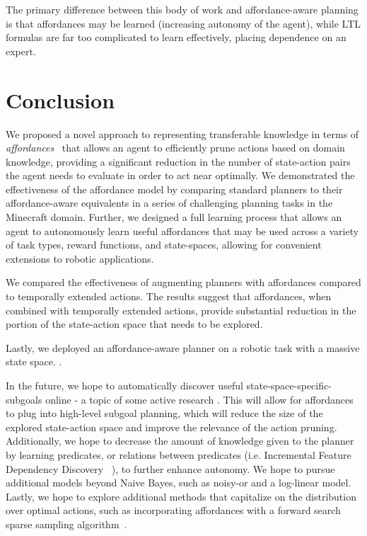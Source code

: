 \documentclass[conference]{IEEEtran}
\newcommand{\dnote}[1]{\textcolor{Green}{\textbf{}}}
\begin{document}
The primary difference between this body of work and affordance-aware planning is that affordances may be learned (increasing autonomy of the agent), while LTL formulas are far too complicated to learn effectively, placing dependence on an expert.

\section{Conclusion}
\label{sec:conclusion}
\dnote{Conclusion could use some work/rewriting}
We proposed a novel approach to representing transferable knowledge in terms of
{\em affordances}~\cite{gibson77} that allows an agent to efficiently prune actions 
based on domain knowledge, providing a significant reduction in the number of state-action
pairs the agent needs to evaluate in order to act near optimally. We demonstrated the 
effectiveness of the affordance model by comparing standard planners to their affordance-aware
equivalents in a series of challenging planning tasks in the Minecraft domain. Further, we designed
a full learning process that allows an agent to autonomously learn useful affordances that may be used
across a variety of task types, reward functions, and state-spaces, allowing for convenient extensions 
to robotic applications.

We compared the effectiveness of augmenting planners with affordances compared to 
temporally extended actions. The results suggest that affordances, when combined with 
temporally extended actions, provide substantial reduction in the portion of the state-action 
space that needs to be explored.

Lastly, we deployed an affordance-aware planner on a robotic task with a massive 
state space. \dnote{Need to flesh out once we have more detail}.

In the future, we hope to automatically discover useful state-space-specific-subgoals online 
- a topic of some active research \cite{Mcgovern01automaticdiscovery,Simsek:2005:IUS:1102351.1102454}.
This will allow for affordances to plug into high-level subgoal planning, which will reduce the size of the 
explored state-action space and improve the relevance of the action pruning. Additionally, we hope to 
decrease the amount of knowledge given to the planner by learning predicates, or relations between predicates (i.e. Incremental Feature Dependency Discovery ~\cite{ICML2011Geramifard_473}), to further enhance autonomy. We hope to pursue additional models beyond Naive Bayes, such as noisy-or and a log-linear model. Lastly, we hope to explore additional methods that capitalize on the distribution over optimal actions, such as incorporating affordances with a forward search sparse sampling algorithm~\cite{walsh2010integrating}.

{\small


}
\end{document}
